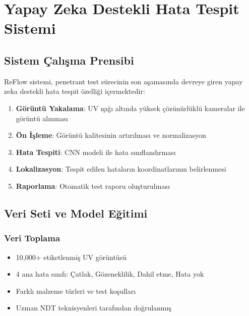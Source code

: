 \documentclass[12pt,a4paper]{article}
\begin{document}
\section{Yapay Zeka Destekli Hata Tespit Sistemi}

\subsection{Sistem Çalışma Prensibi}

ReFlow sistemi, penetrant test sürecinin son aşamasında devreye giren yapay zeka destekli hata tespit özelliği içermektedir:

\begin{enumerate}
    \item \textbf{Görüntü Yakalama}: UV ışığı altında yüksek çözünürlüklü kameralar ile görüntü alınması
    \item \textbf{Ön İşleme}: Görüntü kalitesinin artırılması ve normalizasyon
    \item \textbf{Hata Tespiti}: CNN modeli ile hata sınıflandırması
    \item \textbf{Lokalizasyon}: Tespit edilen hataların koordinatlarının belirlenmesi
    \item \textbf{Raporlama}: Otomatik test raporu oluşturulması
\end{enumerate}

\subsection{Veri Seti ve Model Eğitimi}

\subsubsection{Veri Toplama}
\begin{itemize}
    \item 10,000+ etiketlenmiş UV görüntüsü
    \item 4 ana hata sınıfı: Çatlak, Gözeneklilik, Dahil etme, Hata yok
    \item Farklı malzeme türleri ve test koşulları
    \item Uzman NDT teknisyenleri tarafından doğrulanmış
\end{itemize}
\end{document}
